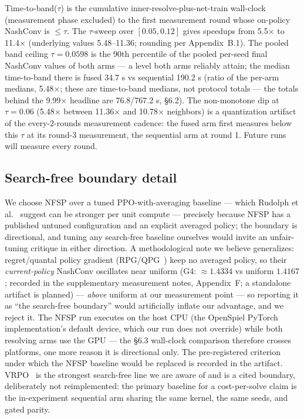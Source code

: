 \documentclass[11pt]{article}
\begin{document}
Time-to-band($\tau$) is the cumulative inner-resolve-plus-net-train wall-clock
(measurement phase excluded) to the first measurement round whose on-policy NashConv is
$\le \tau$. The $\tau$-sweep over $[0.05, 0.12]$ gives speedups from 5.5$\times$ to
11.4$\times$ (underlying values 5.48--11.36; rounding per Appendix~B.1). The pooled band
ceiling $\tau = 0.0598$ is the 90th percentile of the pooled per-seed final NashConv
values of both arms --- a level both arms reliably attain; the median time-to-band there
is fused 34.7 s vs sequential 190.2 s (ratio of the per-arm medians, 5.48$\times$; these
are time-to-band medians, not protocol totals --- the totals behind the 9.99$\times$
headline are 76.8/767.2 s, \S6.2). The non-monotone dip at $\tau = 0.06$ (5.48$\times$
between 11.36$\times$ and 10.78$\times$ neighbors) is a quantization artifact of the
every-2-rounds measurement cadence: the fused arm first measures below this $\tau$ at
its round-3 measurement, the sequential arm at round 1. Future runs will measure every
round.

\subsection{Search-free boundary detail}

We choose NFSP over a tuned PPO-with-averaging baseline --- which Rudolph et
al.~\citep{Rudolph2025} suggest can be stronger per unit compute --- precisely because
NFSP has a published untuned configuration and an explicit averaged policy; the boundary
is directional, and tuning any search-free baseline ourselves would invite an
unfair-tuning critique in either direction. A methodological note we believe
generalizes: regret/quantal policy gradient (RPG/QPG~\citep{Srinivasan2018}) keep no
averaged policy, so their \emph{current-policy} NashConv oscillates near uniform (G4:
$\approx 1.4334$ vs uniform $1.4167$; recorded in the supplementary measurement notes,
Appendix~F; a standalone artifact is planned) --- \emph{above} uniform at our
measurement point --- so reporting it as ``the search-free boundary'' would artificially
inflate our advantage, and we reject it. The NFSP run executes on the host CPU (the
OpenSpiel PyTorch implementation's default device, which our run does not override)
while both resolving arms use the GPU --- the \S6.3 wall-clock comparison therefore
crosses platforms, one more reason it is directional only. The pre-registered criterion
under which the NFSP baseline would be replaced is recorded in the artifact.
VRPO~\citep{VRPO} is the strongest search-free line we are aware of and is a cited
boundary, deliberately not reimplemented: the primary baseline for a cost-per-solve
claim is the in-experiment sequential arm sharing the same kernel, the same seeds, and
gated parity.
\end{document}
